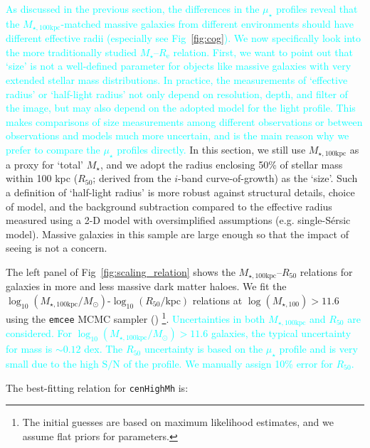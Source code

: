 \documentclass[a4paper,fleqn,usenatbib]{mnras}
\def\ser{{S\'{e}rsic\ }}
\def\rbcg{\texttt{cenHighMh}}
\def\mstar{{$M_{\star}$}}
\def\mtot{{$M_{\star,100\mathrm{kpc}}$}}
\def\logmtot{{$\log_{10} (M_{\star,100\mathrm{kpc}}/M_{\odot})$}}
\def\s2n{{$\mathrm{S}/\mathrm{N}$}}
\def\mden{{$\mu_{\star}$}}
\newcommand{\song}[1]{\textcolor{cyan}{#1}}
\begin{document}
    \song{
    As discussed in the previous section, the differences in the \mden{} profiles 
    reveal that the \mtot{}-matched massive galaxies from different environments 
    should have different effective radii (especially see Fig~\ref{fig:cog}). 
    We now specifically look into the more traditionally studied 
    \mstar{}--$R_{\mathrm{e}}$ relation.
    First, we want to point out that `size' is not a well-defined parameter for 
    objects like massive galaxies with very extended stellar mass distributions. 
    In practice, the measurements of `effective radius' or `half-light radius' 
    not only depend on resolution, depth, and filter of the image, but may also 
    depend on the adopted model for the light profile.  
    This makes comparisons of size measurements among different observations 
    or between observations and models much more uncertain, and is the main reason
    why we prefer to compare the \mden{} profiles directly.
    }
    In this section, we still use \mtot{} as a proxy for `total' \mstar{}, and we 
    adopt the radius enclosing 50\% of stellar mass within 100 kpc ($R_{\mathrm{50}}$; 
    derived from the $i$-band curve-of-growth) as the `size'. 
    Such a definition of `half-light radius' is more robust against structural 
    details, choice of model, and the background subtraction compared to the 
    effective radius measured using a 2-D model with oversimplified assumptions 
    (e.g. single-\ser{} model). 
    Massive galaxies in this sample are large enough so that the impact of seeing 
    is not a concern.
    
    The left panel of Fig~\ref{fig:scaling_relation} shows the 
    \mtot{}--$R_{\mathrm{50}}$ relations for galaxies in more and less massive
    dark matter haloes. 
    We fit the \logmtot{}-$\log_{10} (R_{\mathrm{50}}/\mathrm{kpc})$ relations at 
    $\log(M_{\star,100})>11.6$ using the \texttt{emcee} MCMC sampler 
    (\citealt{Emcee}) \footnote{The initial guesses are based on maximum 
    likelihood estimates, and we assume flat priors for parameters.}.
    \song{
    Uncertainties in both \mtot{} and $R_{\mathrm{50}}$ are considered. 
    For \logmtot{}$>11.6$ galaxies, the typical uncertainty for mass is $\sim 0.12$
    dex.  
    The $R_{\mathrm{50}}$ uncertainty is based on the \mden{} profile and
    is very small due to the high \s2n{} of the profile. 
    We manually assign 10\% error for $R_{\mathrm{50}}$. 
    }
    
    The best-fitting relation for \rbcg{} is:
    
\end{document}
